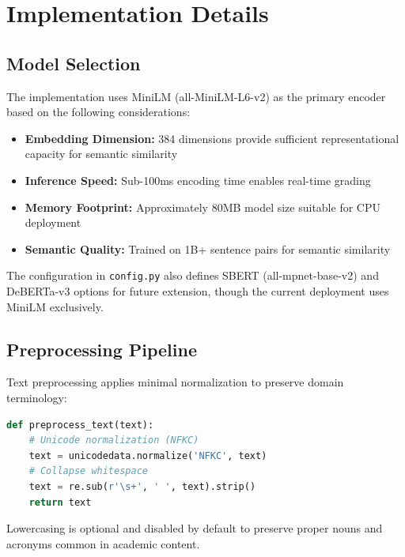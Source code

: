 \documentclass[conference]{IEEEtran}
\begin{document}
\section{Implementation Details}

\subsection{Model Selection}
The implementation uses MiniLM (all-MiniLM-L6-v2) as the primary encoder based on the following considerations:

\begin{itemize}
    \item \textbf{Embedding Dimension:} 384 dimensions provide sufficient representational capacity for semantic similarity
    \item \textbf{Inference Speed:} Sub-100ms encoding time enables real-time grading
    \item \textbf{Memory Footprint:} Approximately 80MB model size suitable for CPU deployment
    \item \textbf{Semantic Quality:} Trained on 1B+ sentence pairs for semantic similarity
\end{itemize}

The configuration in \texttt{config.py} also defines SBERT (all-mpnet-base-v2) and DeBERTa-v3 options for future extension, though the current deployment uses MiniLM exclusively.

\subsection{Preprocessing Pipeline}
Text preprocessing applies minimal normalization to preserve domain terminology:
\begin{lstlisting}[language=Python, basicstyle=\small\ttfamily]
def preprocess_text(text):
    # Unicode normalization (NFKC)
    text = unicodedata.normalize('NFKC', text)
    # Collapse whitespace
    text = re.sub(r'\s+', ' ', text).strip()
    return text
\end{lstlisting}

Lowercasing is optional and disabled by default to preserve proper nouns and acronyms common in academic content.
\end{document}
